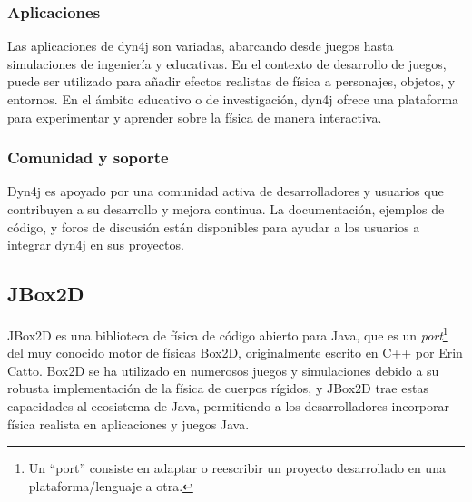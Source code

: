 \subsubsection{Aplicaciones}
Las aplicaciones de dyn4j son variadas, abarcando desde juegos hasta simulaciones de ingeniería y educativas. En el contexto de desarrollo de juegos, puede ser utilizado para añadir efectos realistas de física a personajes, objetos, y entornos. En el ámbito educativo o de investigación, dyn4j ofrece una plataforma para experimentar y aprender sobre la física de manera interactiva.
\subsubsection{Comunidad y soporte}
Dyn4j es apoyado por una comunidad activa de desarrolladores y usuarios que contribuyen a su desarrollo y mejora continua. La documentación, ejemplos de código, y foros de discusión están disponibles para ayudar a los usuarios a integrar dyn4j en sus proyectos.

\subsection{JBox2D}

JBox2D\cite{JBox2D} es una biblioteca de física de código abierto para Java, que es un \textit{port}\footnote{Un ``port'' consiste en adaptar o reescribir un proyecto desarrollado en una plataforma/lenguaje a otra.} del muy conocido motor de físicas Box2D, originalmente escrito en C++ por Erin Catto. Box2D se ha utilizado en numerosos juegos y simulaciones debido a su robusta implementación de la física de cuerpos rígidos, y JBox2D trae estas capacidades al ecosistema de Java, permitiendo a los desarrolladores incorporar física realista en aplicaciones y juegos Java.

